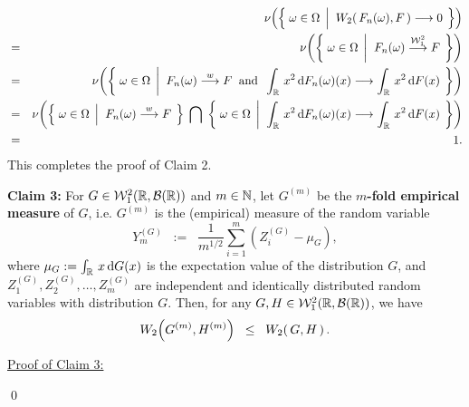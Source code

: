\begin{eqnarray*}
&&
\nu\!\left(\left\{\;
\omega \in \Omega
\;\left\vert\;\;
W_{2}\!\left(\,F_{n}(\omega), F\,\right) \overset{\textnormal{\color{white}X}}{\longrightarrow} 0
\right.
\;\right\}\right)
\\
& = &
\nu\!\left(\left\{\;
\omega \in \Omega
\;\left\vert\;\;
F_{n}(\omega) \overset{\mathcal{W}^{2}_{1}}{\longrightarrow} F
\right.
\;\right\}\right)
\\
& = &
\nu\!\left(\left\{\;
\omega \in \Omega
\;\left\vert\;\;
F_{n}(\omega) \overset{w}{\longrightarrow} F
\;\;\textnormal{and}\;\;
\int_{\Re}\,x^{2}\,\d F_{n}(\omega)(x) \longrightarrow \int_{\Re}\,x^{2}\,\d F(x)
\right.
\;\right\}\right)
\\
& = &
\nu\!\left(
\left\{\;
\omega \in \Omega
\;\left\vert\;\;
F_{n}(\omega) \overset{w}{\longrightarrow} F
\right.
\;\right\}
\;\bigcap\;
\left\{\;
\omega \in \Omega
\;\left\vert\;\;
\int_{\Re}\,x^{2}\,\d F_{n}(\omega)(x) \longrightarrow \int_{\Re}\,x^{2}\,\d F(x)
\right.
\;\right\}
\right)
\\
&=& 1.
\end{eqnarray*}
This completes the proof of Claim 2.

\vskip 0.8cm
\begin{center}
\begin{minipage}{5.5in}
\noindent
\textbf{Claim 3:}\; For $G \in \mathcal{W}^{2}_{1}\!\left(\mathbb{R},\mathcal{B}(\mathbb{R})\right)$ and $m \in \mathbb{N}$,
let $G^{(m)}$ be the \textbf{$m$-fold empirical measure} of $G$, i.e.
$G^{(m)}$ is the (empirical) measure of the random variable
\begin{equation*}
Y_{m}^{(G)} \;\; := \;\; \dfrac{1}{m^{1/2}} \sum_{i=1}^{m}\left(Z_{i}^{(G)} - \mu_{G}\right),
\end{equation*}
where $\mu_{G} := \int_{\mathbb{R}}\,x\,\textnormal{d} G(x)$ is the expectation value of the distribution $G$,
and $Z^{(G)}_{1},Z^{(G)}_{2},\ldots,Z^{(G)}_{m}$ are independent and
identically distributed random variables with distribution $G$.
Then, for any $G, H \in \mathcal{W}^{2}_{1}\!\left(\mathbb{R},\mathcal{B}(\mathbb{R})\right)$, we have
\begin{equation*}
W_{2}\!\left(G^{(m)},H^{(m)}\right)
\;\; \leq \;\;
W_{2}\!\left(\,G,H\,\right).
\end{equation*}
\end{minipage}
\end{center}

\noindent
\underline{Proof of Claim 3:}\;\;

\qed

